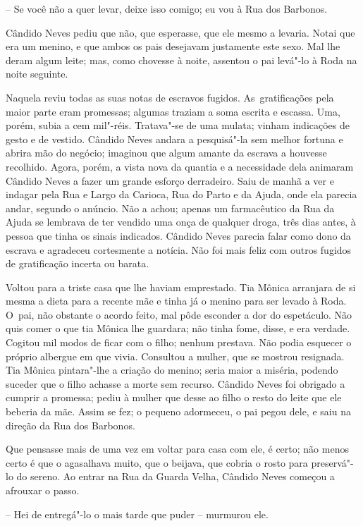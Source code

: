 -- Se você não a quer levar, deixe isso comigo; eu vou à Rua dos
Barbonos.

Cândido Neves pediu que não, que esperasse, que ele mesmo a levaria.
Notai que era um menino, e que ambos os pais desejavam justamente este
sexo. Mal lhe deram algum leite; mas, como chovesse à noite, assentou o
pai levá"-lo à Roda na noite seguinte.

Naquela reviu todas as suas notas de escravos fugidos. As~gratificações
pela maior parte eram promessas; algumas traziam a soma escrita e
escassa. Uma, porém, subia a cem mil"-réis. Tratava"-se de uma mulata;
vinham indicações de gesto e de vestido. Cândido Neves andara a
pesquisá"-la sem melhor fortuna e abrira mão do negócio; imaginou que
algum amante da escrava a houvesse recolhido. Agora, porém, a vista nova
da quantia e a necessidade dela animaram Cândido Neves a fazer um grande
esforço derradeiro. Saiu de manhã a ver e indagar pela Rua e Largo da
Carioca, Rua do Parto e da Ajuda, onde ela parecia andar, segundo o
anúncio. Não a achou; apenas um farmacêutico da Rua da Ajuda se lembrava
de ter vendido uma onça de qualquer droga, três dias antes, à pessoa que
tinha os sinais indicados. Cândido Neves parecia falar como dono da
escrava e agradeceu cortesmente a notícia. Não foi mais feliz com outros
fugidos de gratificação incerta ou barata.

Voltou para a triste casa que lhe haviam emprestado. Tia Mônica
arranjara de si mesma a dieta para a recente mãe e tinha já o menino
para ser levado à Roda. O~pai, não obstante o acordo feito, mal pôde
esconder a dor do espetáculo. Não quis comer o que tia Mônica lhe
guardara; não tinha fome, disse, e era verdade. Cogitou mil modos de
ficar com o filho; nenhum prestava. Não podia esquecer o próprio
albergue em que vivia. Consultou a mulher, que se mostrou resignada. Tia
Mônica pintara"-lhe a criação do menino; seria maior a miséria, podendo
suceder que o filho achasse a morte sem recurso. Cândido Neves foi
obrigado a cumprir a promessa; pediu à mulher que desse ao filho o resto
do leite que ele beberia da mãe. Assim se fez; o pequeno adormeceu, o
pai pegou dele, e saiu na direção da Rua dos Barbonos.

Que pensasse mais de uma vez em voltar para casa com ele, é certo; não
menos certo é que o agasalhava muito, que o beijava, que cobria o rosto
para preservá"-lo do sereno. Ao entrar na Rua da Guarda Velha, Cândido
Neves começou a afrouxar o passo.

-- Hei de entregá"-lo o mais tarde que puder -- murmurou ele.

